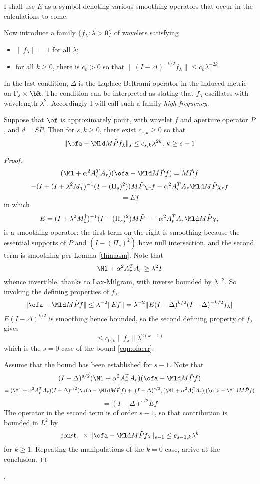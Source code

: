 I shall use $E$ as a symbol denoting various smoothing operators that occur in the calculations to come.

Now introduce a family $\{f_{\lambda}: \lambda>0\}$ of wavelets satisfying
\begin{itemize}
\item $\|f_{\lambda}\|=1$ for all $\lambda$;
\item for all $k \ge 0$, there is $c_k>0$ so that $\|(I - \Delta)^{-k/2}f_{\lambda}\| \le c_k \lambda^{-2k}$
\end{itemize}
In the last condition, $\Delta$ is the Laplace-Beltrami operator in the induced metric on $\Gamma_s \times \bR$. The condition can be interpreted as stating that $f_{\lambda}$ oscillates with wavelength $\lambda^2$. Accordingly I will call such a family {\em high-frequency}.

\begin{lemma}\label{thm:ofaerr}
Suppose that $\of$ is approximately point, with wavelet $f$ and aperture operator $\tilde{P}$, and $d=S\tilde{P}$. Then
for $s, k \ge 0$, there exist $c_{s,k}\ge 0$ so that
\begin{equation}
\label{eqn:ofaerr}
\|\ofa - \Mld M\tilde{P}f_{\lambda}\|_s \le c_{s,k}\lambda^{2k}, \,k\ge s+1
\end{equation}
\end{lemma}
\begin{proof}
\[
(\Ml + \alpha^2 A_r^TA_r)(\ofa - \Mld M\tilde{P}f) = M\tilde{P}f 
\]
\[
- (I + (I + \lambda^2 M_1^{\dagger})^{-1} (I-(\Pi_s)^2)) M\tilde{P}\chi_rf -\alpha^2 A_r^TA_r \Mld M\tilde{P}\chi_rf
\]
\begin{equation}
\label{eqn:old}
= E f
\end{equation}
in which 
\[
E = (I + \lambda^2 M_1^{\dagger})^{-1} (I-(\Pi_s)^2) M\tilde{P} - 
-\alpha^2 A_r^TA_r \Mld M\tilde{P}\chi_r
\]
is a smoothing operator: the first term on the right is smoothing because the essential supports of $\tilde{P}$ and $(I-(\Pi_s)^2)$ have null intersection, and the second term is smoothing per Lemma \ref{thm:asm}. Note that 
\[
\Ml + \alpha^2 A_r^TA_r \ge \lambda^2 I
\]
whence invertible, thanks to Lax-Milgram, with inverse bounded by $\lambda^{-2}$. So invoking the defining properties of $f_{\lambda}$,
\[
\|\ofa - \Mld M\tilde{P}f\| \le \lambda^{-2}\|Ef\| = \lambda^{-2}\|E(I-\Delta)^{k/2}(I-\Delta)^{-k/2}f_{\lambda}\|
\]
$E(I-\Delta)^{k/2}$ is smoothing hence bounded, so the second defining property of $f_{\lambda}$ gives 
\[
\le c_{0,k}\|f_{\lambda}\|\lambda^{2(k-1)}
\]
which is the $s=0$ case of the bound \ref{eqn:ofaerr}.

Assume that the bound has been established for $s-1$. Note that
\[
(I-\Delta)^{s/2}(\Ml + \alpha^2 A_r^TA_r)(\ofa - \Mld M\tilde{P}f) 
\]
\[
=(\Ml + \alpha^2 A_r^TA_r)(I-\Delta)^{s/2}(\ofa - \Mld M\tilde{P}f) 
+[(I-\Delta)^{s/2},(\Ml + \alpha^2 A_r^TA_r)](\ofa - \Mld M\tilde{P}f) 
\]
\[
=(I-\Delta)^{s/2}Ef
\]
The operator in the second term is of order $s-1$, so that contribution is bounded in $L^2$ by 
\[
\mbox{const. } \times \|\ofa - \Mld M\tilde{P}f_{\lambda}\|_{s-1} \le c_{s-1,k} \lambda^{k}
\]
for $k \ge 1$. Repeating the manipulations of the $k=0$ case, arrive at the conclusion.
\end{proof},

